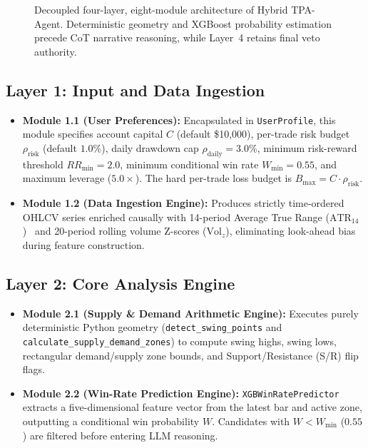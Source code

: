 \documentclass[conference]{IEEEtran}
\begin{document}
\begin{figure}[t]
{%
}
\caption{Decoupled four-layer, eight-module architecture of Hybrid TPA-Agent. Deterministic geometry and XGBoost probability estimation precede CoT narrative reasoning, while Layer~4 retains final veto authority.}
\label{fig:architecture}
\end{figure}

\subsection{Layer 1: Input and Data Ingestion}
\begin{itemize}
    \item \textbf{Module 1.1 (User Preferences):} Encapsulated in \texttt{UserProfile}, this module specifies account capital $C$ (default \$10,000), per-trade risk budget $\rho_{\text{risk}}$ (default $1.0\%$), daily drawdown cap $\rho_{\text{daily}} = 3.0\%$, minimum risk-reward threshold $RR_{\min} = 2.0$, minimum conditional win rate $W_{\min} = 0.55$, and maximum leverage ($5.0\times$). The hard per-trade loss budget is $B_{\max} = C \cdot \rho_{\text{risk}}$.
    \item \textbf{Module 1.2 (Data Ingestion Engine):} Produces strictly time-ordered OHLCV series enriched causally with 14-period Average True Range ($\text{ATR}_{14}$)~\cite{wilder1978new} and 20-period rolling volume Z-scores ($\text{Vol}_{z}$), eliminating look-ahead bias during feature construction.
\end{itemize}

\subsection{Layer 2: Core Analysis Engine}
\begin{itemize}
    \item \textbf{Module 2.1 (Supply \& Demand Arithmetic Engine):} Executes purely deterministic Python geometry (\texttt{detect\_swing\_points} and \texttt{calculate\_supply\_demand\_zones}) to compute swing highs, swing lows, rectangular demand/supply zone bounds, and Support/Resistance (S/R) flip flags.
    \item \textbf{Module 2.2 (Win-Rate Prediction Engine):} \texttt{XGBWinRatePredictor} extracts a five-dimensional feature vector from the latest bar and active zone, outputting a conditional win probability $W$. Candidates with $W < W_{\min}$ ($0.55$) are filtered before entering LLM reasoning.
\end{itemize}
\end{document}
